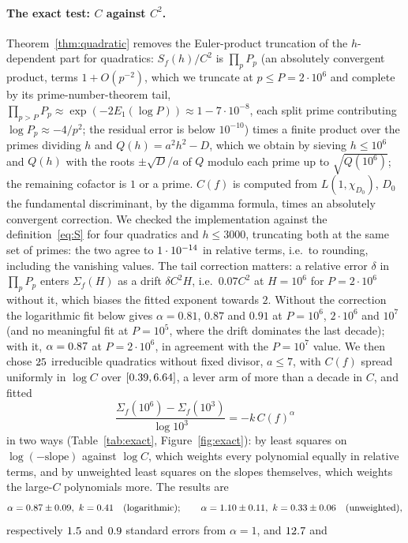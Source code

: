 \documentclass[11pt,a4paper]{article}
\theoremstyle{remark}\newtheorem{remark}[theorem]{Remark}
\begin{document}
\paragraph{The exact test: $C$ against $C^2$.} Theorem~\ref{thm:quadratic} removes the Euler-product
truncation of the $h$-dependent part for quadratics: $S_f(h)/C^2$ is $\prod_pP_p$ (an absolutely
convergent product, terms $1+O(p^{-2})$, which we truncate at $p\le P=2\cdot10^6$ and complete by its
prime-number-theorem tail, $\prod_{p>P}P_p\approx\exp(-2E_1(\log P))\approx1-7\cdot10^{-8}$, each split prime
contributing $\log P_p\approx-4/p^2$; the residual error is below $10^{-10}$) times a finite product over
the primes dividing $h$ and $Q(h)=a^2h^2-D$, which we
obtain by sieving $h\le10^6$ and $Q(h)$ with the roots $\pm\sqrt D/a$ of $Q$ modulo each prime up to
$\sqrt{Q(10^6)}$; the remaining cofactor is $1$ or a prime. $C(f)$ is computed from $L(1,\chi_{D_0})$,
$D_0$ the fundamental discriminant, by the digamma formula, times an absolutely convergent correction.
We checked the implementation against the definition~\eqref{eq:S} for four quadratics and $h\le3000$,
truncating both at the same set of primes: the two agree to $1\cdot10^{-14}$ in relative terms, i.e.\ to
rounding, including the vanishing values. The tail correction matters: a relative error $\delta$ in
$\prod_pP_p$ enters $\Sigma_f(H)$ as a drift $\delta C^2H$, i.e.\ $0.07C^2$ at $H=10^6$ for $P=2\cdot10^6$
without it, which biases the fitted exponent towards $2$. Without the correction the logarithmic fit
below gives $\alpha=0.81$, $0.87$ and $0.91$ at $P=10^6$, $2\cdot10^6$ and $10^7$ (and no meaningful fit at
$P=10^5$, where the drift dominates the last decade); with it, $\alpha=0.87$ at $P=2\cdot10^6$, in
agreement with the $P=10^7$ value. We then chose $25$ irreducible quadratics without fixed
divisor, $a\le7$, with $C(f)$ spread uniformly in $\log C$ over $[0.39,6.64]$, a lever arm of more
than a decade in $C$, and fitted
\[
\frac{\Sigma_f(10^6)-\Sigma_f(10^3)}{\log10^3}=-k\,C(f)^\alpha
\]
in two ways (Table~\ref{tab:exact}, Figure~\ref{fig:exact}): by least squares on
$\log(-\text{slope})$ against $\log C$, which weights every polynomial equally in relative terms, and by
unweighted least squares on the slopes themselves, which weights the large-$C$ polynomials more. The
results are
\[
\alpha=\exAlpha\pm\exAlphaSe,\ k=\exK\quad\text{(logarithmic)};\qquad
\alpha=\exAlphaLin\pm\exAlphaLinSe,\ k=\exKLin\pm\exKLinSe\quad\text{(unweighted)},
\]
respectively $1.5$ and $0.9$ standard errors from $\alpha=1$, and $12.7$ and
\end{document}
